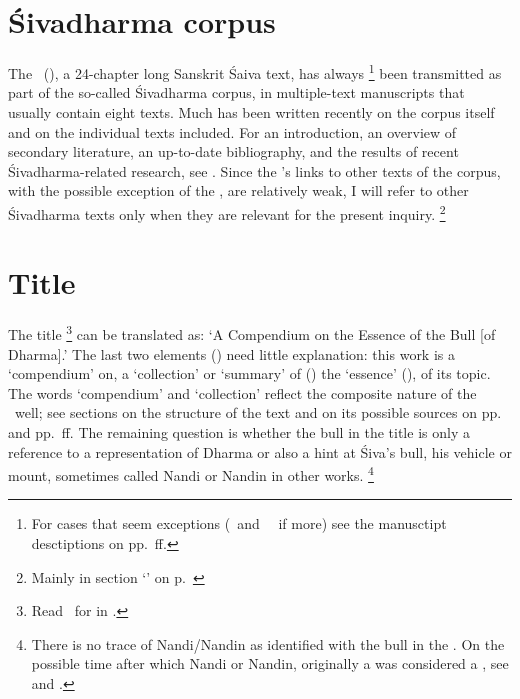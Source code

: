 

\thispagestyle{empty}
\frenchspacing

\section{Śivadharma corpus}
\fancyhead[LE]{}
\fancyhead[RE]{}
\fancyhead[LO]{}
\fancyhead[RO]{}

The \Vss\ (\VSS), a 24-chapter long Sanskrit Śaiva text,
has always%
		\footnote{For cases that seem exceptions 
		(\msKoa\ and \msPaperA\ \CHECK\ if more)
						see the manusctipt desctiptions 
						on pp.~\pageref{mss_descr}ff.}
been transmitted as part of the so-called Śivadharma corpus,
in multiple-text manuscripts that usually contain 
eight texts. Much has been written recently
on the corpus itself and on the individual
texts included. 
For an introduction, an overview of secondary 
literature, an up-to-date bibliography, and the results of 
recent Śivadharma-related research, see
. 
Since the \VSS's links to other texts of the corpus, 
with the possible exception of the \DharmP, 
are relatively weak, I will refer to other
Śivadharma texts only when they are relevant
for the present inquiry.%
		\footnote{Mainly in section `\CHECK' on 
		p.~\pageref{vss_connection_other_sd_texts}}




\section{Title}\label{title}
The title \Vss%
	\footnote{Read \Vss\ for 
	in .}
can be translated as:
`A Compendium on the Essence of the Bull [of Dharma].'
The last two elements () need
little explanation: this work is a 
`compendium' on, a `collection' or `summary' of ()
the `essence' (), of its topic. The words 
`compendium' and `collection' reflect the composite nature of
the \Vss\ well; see sections on the structure of the text and
on its possible sources on 
pp.~\pageref{structure} and 
pp.~\pageref{vss_connection_other_texts}ff. 
The remaining question is whether the bull in the title 
is only a reference to a representation of Dharma 
or also a hint at Śiva's bull, his vehicle or mount, 
sometimes called Nandi or Nandin in other works.%
		\footnote{There is no trace of Nandi/Nandin
		as identified with the bull in the \Vss.
		On the possible time after which 
		Nandi or Nandin, originally a  
		was considered a , see 
		 and 
		.}


